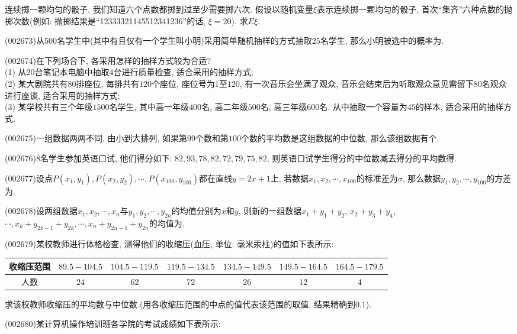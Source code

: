 连续掷一颗均匀的骰子, 我们知道六个点数都掷到过至少需要掷六次. 假设以随机变量$\xi$表示连续掷一颗均匀的骰子, 首次``集齐''六种点数的抛掷次数(例如: 抛掷结果是``12333321145512341236''的话, $\xi=20$). 求$E\xi$.
\item (002673)从$500$名学生中(其中有且仅有一个学生叫小明)采用简单随机抽样的方式抽取$25$名学生, 那么小明被选中的概率为.
\item (002674)在下列场合下, 各采用怎样的抽样方式较为合适?\\ 
(1) 从$20$台笔记本电脑中抽取$4$台进行质量检查, 适合采用的抽样方式;\\ 
(2) 某大剧院共有$80$排座位, 每排共有$120$个座位, 座位号为$1$至$120$, 有一次音乐会坐满了观众, 音乐会结束后为听取观众意见需留下$80$名观众进行座谈, 适合采用的抽样方式;\\ 
(3) 某学校共有三个年级$1500$名学生, 其中高一年级$400$名, 高二年级$500$名, 高三年级$600$名. 从中抽取一个容量为$45$的样本, 适合采用的抽样方式.
\item (002675)一组数据两两不同, 由小到大排列, 如果第$99$个数和第$100$个数的平均数是这组数据的中位数, 那么该组数据有个.
\item (002676)$8$名学生参加英语口试, 他们得分如下: $82,93,78,82,72,79,75,82$, 则英语口试学生得分的中位数减去得分的平均数得.
\item (002677)设点$P(x_1,y_1),P(x_2,y_2),\cdots,P(x_{100},y_{100})$都在直线$y=2x+1$上, 若数据$x_1,x_2,\cdots,x_{100}$的标准差为$\sigma$, 那么数据$y_1,y_2,\cdots,y_{100}$的方差为.
\item (002678)设两组数据$x_1,x_2,\cdots,x_n$与$y_1,y_2,\cdots,y_{2n}$的均值分别为$\bar{x}$和$\bar{y}$, 则新的一组数据$x_1+y_1+y_2$, $x_2+y_3+y_4$, $\cdots,x_k+y_{2k-1}+y_{2k},\cdots,x_n+y_{2n-1}+y_{2n}$的均值为.
\item (002679)某校教师进行体格检查, 测得他们的收缩压(血压, 单位: 毫米汞柱)的值如下表所示:
\begin{center}
\begin{tabular}{|c|c|c|c|c|c|c|}
\hline
收缩压范围 & $89.5-104.5$ & $104.5-119.5$ & $119.5-134.5$ & $134.5-149.5$ & $149.5-164.5$ & $164.5-179.5$\\
\hline
人数 & $24$ & $62$ & $72$ & $26$ & $12$ & $4$\\
\hline
\end{tabular}
\end{center}
求该校教师收缩压的平均数与中位数.(用各收缩压范围的中点的值代表该范围的取值, 结果精确到$0.1$).
\item (002680)某计算机操作培训班各学院的考试成绩如下表所示:
